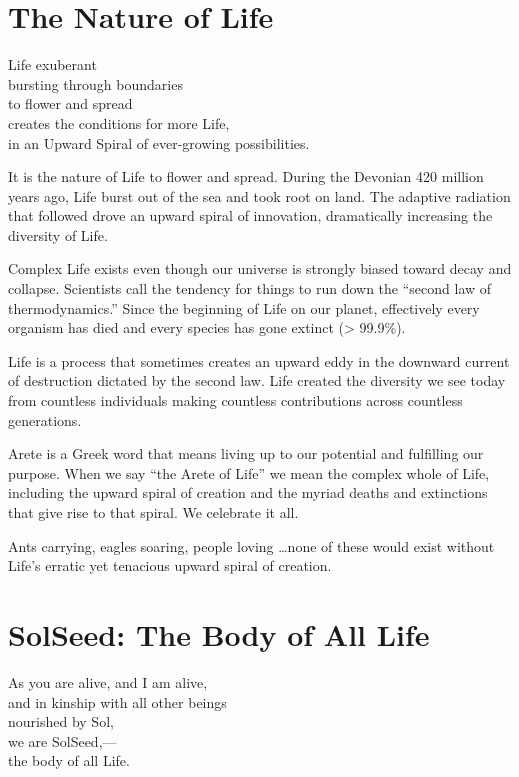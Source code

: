 \documentclass[ebook,12pt,openany,twoside]{memoir}
\newcommand{\tab}{\hspace*{2em}}
\newcommand{\imagefacingchapter}[1]{
  \cleartoverso
  \clearpage \null
  \thispagestyle{cleared}
  \AddToShipoutPictureBG*{%
    \AtStockLowerLeft{%
      \texttt{[image: \#1]}
    }
  }
  \clearpage
}
\begin{document}
\imagefacingchapter{images/UpwardSpiral}
\chapter{The Nature of Life}

\setlength\epigraphwidth{3.6in}
\epigraph{
  Life exuberant\\
  bursting through boundaries\\
  to flower and spread\\
  \tab creates the conditions for more Life,\\
  \tab in an Upward Spiral of ever-growing possibilities.
}{}

\noindent It is the nature of Life to flower and spread. During the Devonian
420 million years ago, Life burst out of the sea and took root on land. The
adaptive radiation that followed drove an upward spiral of innovation,
dramatically increasing the diversity of Life.

Complex Life exists even though our universe is strongly biased toward decay
and collapse. Scientists call the tendency for things to run down the ``second
law of thermodynamics.'' Since the beginning of Life on our planet, effectively
every organism has died and every species has gone extinct (\textgreater
99.9\%).

Life is a process that sometimes creates an upward eddy in the downward current
of destruction dictated by the second law. Life created the diversity we see
today from countless individuals making countless contributions across countless
generations.

Arete is a Greek word that means living up to our potential and fulfilling our
purpose. When we say ``the Arete of Life'' we mean the complex whole of Life,
including the upward spiral of creation and the myriad deaths and extinctions
that give rise to that spiral.  We celebrate it all.

Ants carrying, eagles soaring, people loving \ldots none of these would exist
without Life's erratic yet tenacious upward spiral of creation.



\imagefacingchapter{images/BodyOfAllLife}
\chapter{SolSeed: The Body of All Life}

\setlength\epigraphwidth{2.4in}
\epigraph{
  As you are alive, and I am alive,\\
  and in kinship with all other beings\\
  nourished by Sol,\\
  \tab we are SolSeed,--- \\
  \tab the body of all Life.
}{}
\end{document}
